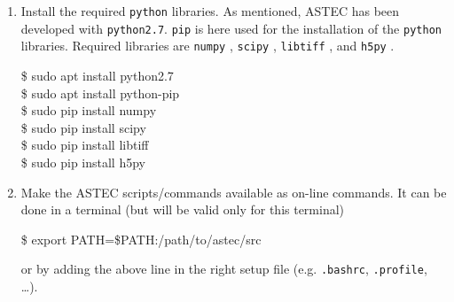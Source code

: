 \begin{enumerate}
\item Install the required \texttt{python} libraries. As mentioned,
  ASTEC has been developed with \texttt{python2.7}. \texttt{pip} is
  here used for the installation of the \texttt{python}
  libraries. Required libraries are \texttt{numpy} , \texttt{scipy} ,
  \texttt{libtiff} , and \texttt{h5py} .
  \begin{code}{0.8}
    \$ sudo apt install python2.7 \\
    \$ sudo apt install python-pip \\
    \$ sudo pip install numpy \\
    \$ sudo pip install scipy \\
    \$ sudo pip install libtiff \\
    \$ sudo pip install h5py \\
  \end{code}

\item Make the ASTEC scripts/commands available as on-line commands.
It can be done in a terminal (but will be valid only for this terminal)
\begin{code}{0.8}
  \$ export PATH=\${PATH}:/path/to/astec/src
\end{code}
or by adding the above line in the right setup file (e.g. \texttt{.bashrc}, \texttt{.profile}, \ldots).

\end{enumerate}









